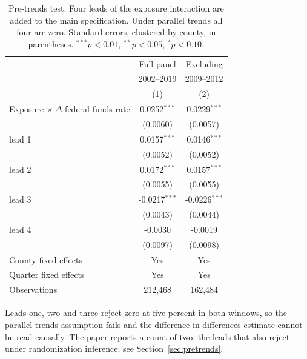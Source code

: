\begin{table}[htbp]
\centering
\caption{Pre-trends test. Four leads of the exposure interaction are added to the main specification. Under parallel trends all four are zero. Standard errors, clustered by county, in parentheses. $^{***}p<0.01$, $^{**}p<0.05$, $^{*}p<0.10$.}
\label{tab:placebo}
\begin{tabular}{lcc}
\toprule
 & Full panel & Excluding \\
 & 2002--2019 & 2009--2012 \\
 & (1) & (2) \\
\midrule
Exposure $\times\ \Delta$ federal funds rate & 0.0252$^{***}$ & 0.0229$^{***}$ \\
 & (0.0060) & (0.0057) \\
\quad lead 1 & 0.0157$^{***}$ & 0.0146$^{***}$ \\
 & (0.0052) & (0.0052) \\
\quad lead 2 & 0.0172$^{***}$ & 0.0157$^{***}$ \\
 & (0.0055) & (0.0055) \\
\quad lead 3 & -0.0217$^{***}$ & -0.0226$^{***}$ \\
 & (0.0043) & (0.0044) \\
\quad lead 4 & -0.0030 & -0.0019 \\
 & (0.0097) & (0.0098) \\
\midrule
County fixed effects & Yes & Yes \\
Quarter fixed effects & Yes & Yes \\
Observations & 212,468 & 162,484 \\
\bottomrule
\end{tabular}

\begin{minipage}{0.92\textwidth}\vspace{4pt}\footnotesize Leads one, two and three reject zero at five percent in both windows, so the parallel-trends assumption fails and the difference-in-differences estimate cannot be read causally. The paper reports a count of two, the leads that also reject under randomization inference; see Section~\ref{sec:pretrends}.\end{minipage}
\end{table}

